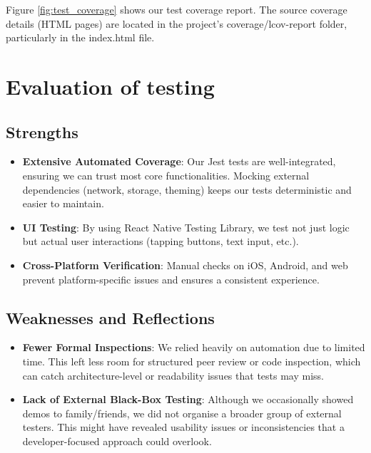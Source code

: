 Figure \ref{fig:test_coverage} shows our test coverage report. The source coverage details (HTML pages) are located in the project’s coverage/lcov-report folder, particularly in the index.html file. 


\section{Evaluation of testing} \label{sect:testing:evaluation}

\subsection{Strengths} \begin{itemize} \item \textbf{Extensive Automated Coverage}: Our Jest tests are well-integrated, ensuring we can trust most core functionalities. Mocking external dependencies (network, storage, theming) keeps our tests deterministic and easier to maintain. \item \textbf{UI Testing}: By using React Native Testing Library, we test not just logic but actual user interactions (tapping buttons, text input, etc.). \item \textbf{Cross-Platform Verification}: Manual checks on iOS, Android, and web prevent platform-specific issues and ensures a consistent experience. \end{itemize}

\subsection{Weaknesses and Reflections} \begin{itemize} \item \textbf{Fewer Formal Inspections}: We relied heavily on automation due to limited time. This left less room for structured peer review or code inspection, which can catch architecture-level or readability issues that tests may miss. \item \textbf{Lack of External Black-Box Testing}: Although we occasionally showed demos to family/friends, we did not organise a broader group of external testers. This might have revealed usability issues or inconsistencies that a developer-focused approach could overlook.\end{itemize}

